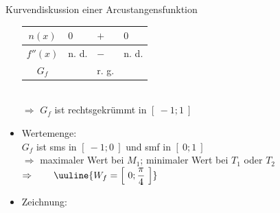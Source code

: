 \begin{Example}{Kurvendiskussion einer Arcustangensfunktion}{}
\begin{itemize}
\begin{minipage}[t]{1.00\linewidth}
{\begin{tabularx}{0.95\linewidth}{c|X|X|X}
                $n(x)$ & $0$ & $+$ & $0$ \\ \hline
                $f''(x)$ & n. d. & $-$ & n. d. \\ \hline
                $G_{f}$ &  & r. g. & \\
            \end{tabularx}
            }
        \end{minipage}\\[2.0ex]
        $\Rightarrow$ \qquad $G_{f}$ ist rechtsgekrümmt in $\left[ \ -1; 1 \ \right]$
    \item Wertemenge: \\[1.0ex]{
        $G_{f}$ ist sms in $\left[ \ -1; 0 \ \right]$ und smf in $\left[ \ 0; 1 \ \right]$\\[1.0ex]
        $\Rightarrow$ \qquad maximaler Wert bei $M_{1}$; \quad minimaler Wert bei $T_{1}$ oder $T_{2}$\\[1.0ex]
        $\Rightarrow \qquad \uuline{W_{f} = \left[ \ 0; \dfrac{\pi}{4} \ \right]}$
        }
    \item Zeichnung: \\[-2.0ex]{
            }
\end{itemize}
\end{Example}
